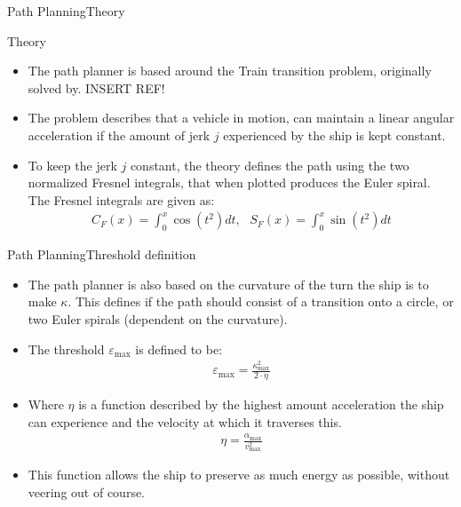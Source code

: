 \documentclass[10pt]{beamer}
\begin{document}
\begin{frame}{Path Planning}{Theory}
  \begin{block}{Theory}
  \begin{itemize}
     \item The path planner is based around the Train transition problem, originally solved by. INSERT REF!
    \item The problem describes that a vehicle in motion, can maintain a linear angular acceleration if the amount of jerk $j$ experienced by the ship is kept constant.
    \item To keep the jerk $j$ constant, the theory defines the path using the two normalized Fresnel integrals, that when plotted produces the Euler spiral. The Fresnel integrals are given as:
    \begin{align}
    C_F(x) = \int_0^x \cos(t^2)dt,\,\,\,\,S_F(x) = \int_0^x \sin(t^2)dt
\label{eq:fresnel}
    \end{align}
  \end{itemize}
  \end{block}
\end{frame}

\begin{frame}{Path Planning}{Threshold definition}
    \begin{itemize}
    	\item The path planner is also based on the curvature of the turn the ship is to make $\kappa$. This defines if the path should consist of a transition onto a circle, or two Euler spirals (dependent on the curvature).
    	\item The threshold $\varepsilon_\text{max}$ is defined to be:
    	\begin{align}
    	\varepsilon_\text{max} = \frac{\kappa_\text{max}^2}{2 \cdot \eta}
    	\end{align}
    	\item Where $\eta$ is a function described by the highest amount acceleration the ship can experience and the velocity at which it traverses this.
    	\begin{align}
    	\eta = \frac{\alpha_\text{max}}{v^2_\text{max}}
    	\end{align}
    	\item This function allows the ship to preserve as much energy as possible, without veering out of course.
    \end{itemize}
\end{frame}
\end{document}
